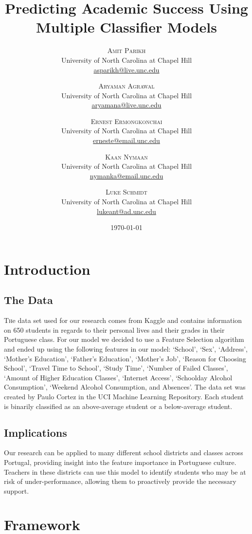\documentclass[twoside,twocolumn]{article}
\title{Predicting Academic Success Using Multiple Classifier Models} %
\author{%
\textsc{Amit Parikh} \\[1ex] %
\normalsize University of North Carolina at Chapel Hill \\ %
\normalsize \href{mailto:john@smith.com}{asparikh@live.unc.edu} %
\and %
\textsc{Aryaman Agrawal} \\[1ex] %
\normalsize University of North Carolina at Chapel Hill \\ %
\normalsize \href{mailto:john@smith.com}{aryamana@live.unc.edu} %
\and %
\textsc{Ernest Ermongkonchai} \\[1ex] %
\normalsize University of North Carolina at Chapel Hill \\ %
\normalsize \href{mailto:jane@smith.com}{erneste@email.unc.edu} %
\and %
\textsc{Kaan Nymaan} \\[1ex] %
\normalsize University of North Carolina at Chapel Hill \\ %
\normalsize \href{mailto:jane@smith.com}{nymanka@email.unc.edu} %
\and %
\textsc{Luke Schmidt} \\[1ex] %
\normalsize University of North Carolina at Chapel Hill \\ %
\normalsize \href{mailto:jane@smith.com}{lukeant@ad.unc.edu} %
}
\date{\today} %
\begin{document}
\maketitle


\section{Introduction}
\subsection{The Data}
\lettrine[nindent=0em,lines=3] {T}he data set used for our research comes from Kaggle and contains information on 650 students in regards to their personal lives and their grades in their Portuguese class. For our model we decided to use a Feature Selection algorithm and ended up using the following features in our model: ‘School’, ‘Sex’, ‘Address’, ‘Mother’s Education’, ‘Father’s Education’, ‘Mother’s Job’, ‘Reason for Choosing School’, ‘Travel Time to School’, ‘Study Time’, ‘Number of Failed Classes’, ‘Amount of Higher Education Classes’, ‘Internet Access’, ‘Schoolday Alcohol Consumption’, ‘Weekend Alcohol Consumption, and Absences’. The data set was created by Paulo Cortez in the UCI Machine Learning Repository. Each student is binarily classified as an above-average student or a below-average student.
\subsection{Implications}
Our research can be applied to many different school districts and classes across Portugal, providing insight into the feature importance in Portuguese culture. Teachers in these districts can use this model to identify students who may be at risk of under-performance, allowing them to proactively provide the necessary support.


\section{Framework}
\end{document}
